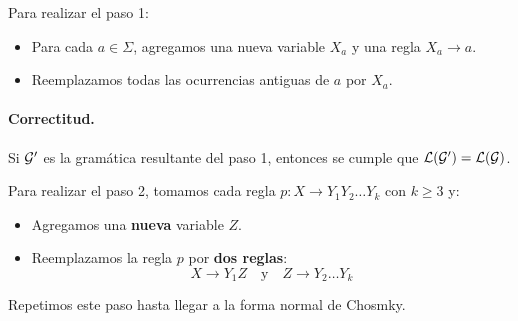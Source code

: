 Para realizar el paso 1:
\begin{itemize}
    \item Para cada $a \in \Sigma$, agregamos una nueva variable $X_a$ y una regla $X_a \to a$.
    \item Reemplazamos todas las ocurrencias antiguas de $a$ por $X_a$.
\end{itemize}


\paragraph{Correctitud.} Si $\mathcal{G}'$ es la gramática resultante del paso 1, entonces se cumple que $\mathcal{L}(\mathcal{G}') = \mathcal{L}(\mathcal{G})$. \bigbreak

Para realizar el paso 2, tomamos cada regla $p: X \to Y_1 Y_2 \ldots Y_k$ con $k \geq 3$ y:
\begin{itemize}
    \item Agregamos una \textbf{nueva} variable $Z$.
    \item Reemplazamos la regla $p$ por \textbf{dos reglas}:
          $$
              X \to Y_1 Z \quad \text{y} \quad Z \to Y_2 \ldots Y_k
          $$
\end{itemize}
Repetimos este paso hasta llegar a la forma normal de Chosmky.


